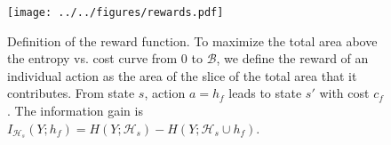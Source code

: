 \begin{figure}[ht]
\centering
\texttt{[image: ../../figures/rewards.pdf]}
\caption[Definition of the reward function for the classification approach.]{
Definition of the reward function.
To maximize the total area above the entropy vs. cost curve from $0$ to $\mathcal{B}$, we define the reward of an individual action as the area of the slice of the total area that it contributes.
From state $s$, action $a = h_f$ leads to state $s'$ with cost $c_f$.
The information gain is $I_{\mathcal{H}_s}(Y; h_f) = H(Y; \mathcal{H}_s) - H(Y; \mathcal{H}_s \cup {h_f})$.
\label{fig:clf_rewards}}
\end{figure}
